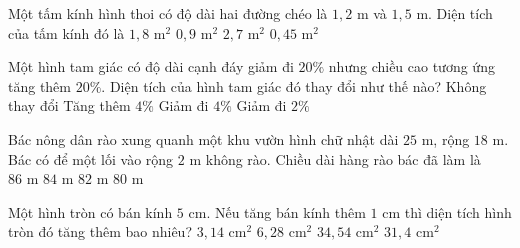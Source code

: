 \begin{ex} %
Một tấm kính hình thoi có độ dài hai đường chéo là $1{,}2\text{ m}$ và $1{,}5\text{ m}$. Diện tích của tấm kính đó là
\choice
{$1{,}8\text{ m}^2$}
{\True $0{,}9\text{ m}^2$}
{$2{,}7\text{ m}^2$}
{$0{,}45\text{ m}^2$}
\end{ex}

\begin{ex} %
Một hình tam giác có độ dài cạnh đáy giảm đi $20\%$ nhưng chiều cao tương ứng tăng thêm $20\%$. Diện tích của hình tam giác đó thay đổi như thế nào?
\choice
{Không thay đổi}
{Tăng thêm $4\%$}
{\True Giảm đi $4\%$}
{Giảm đi $2\%$}
\end{ex}

\begin{ex} %
Bác nông dân rào xung quanh một khu vườn hình chữ nhật dài $25\text{ m}$, rộng $18\text{ m}$. Bác có để một lối vào rộng $2\text{ m}$ không rào. Chiều dài hàng rào bác đã làm là
\choice
{$86\text{ m}$}
{\True $84\text{ m}$}
{$82\text{ m}$}
{$80\text{ m}$}
\end{ex}

\begin{ex} %
Một hình tròn có bán kính $5\text{ cm}$. Nếu tăng bán kính thêm $1\text{ cm}$ thì diện tích hình tròn đó tăng thêm bao nhiêu?
\choice
{$3{,}14\text{ cm}^2$}
{$6{,}28\text{ cm}^2$}
{\True $34{,}54\text{ cm}^2$}
{$31{,}4\text{ cm}^2$}
\end{ex}

